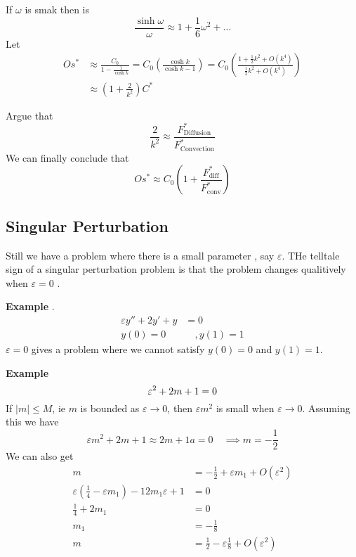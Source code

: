 \documentclass{article}
\theoremstyle{remark}
\newcommand{\newpara}
  {
  \vskip 0.4cm
  }
\begin{document}
\newpara
If $\omega $ is smak then is \[
\frac{\sinh \omega }{\omega }  \approx 1 + \frac{1}{6} \omega ^2 + \ldots
\] 
Let \[
  \begin{split}
Os ^{* }  & \approx \frac{C_{0}}{ 1- \frac{1}{\cosh k}}  = C_{0}\left( \frac{\cosh k}{ \cosh k - 1}  \right) = C_{0}\left( \frac{1+ \frac{1}{2} k^2 + O\left( k^{4} \right)}{ \frac{1}{2} k^2 + O\left( k^{4} \right)}  \right) \\
 & \approx \left( 1+ \frac{2}{k^2} \right) C^{*}
  \end{split} 
\] 

Argue that \[
\frac{2}{k ^{2}} \approx \frac{F^{*} _{\text{Diffusion}}}{ F^{*} _{\text{Convection}}} 
\] 
We can finally conclude that \[
Os ^{* } \approx C_{0}\left( 1+ \frac{F^{*} _{ \text{diff}}}{ F ^{*} _{\text{conv}}}  \right)
\] 

\subsection{Singular Perturbation}%
\label{sub:singular_perturbation}

Still we have a problem where there is a small parameter ,  say $\varepsilon $. THe telltale sign of a singular perturbation problem is that the problem changes qualitively when  $\varepsilon  = 0 $ .

\newpara
\textbf{Example} . \[
  \begin{split}
\varepsilon  y''  + 2 y'  + y &= 0 \\
y\left( 0 \right) =0  & \quad , y\left( 1 \right) = 1 
  \end{split} 
\] 
$\varepsilon  = 0$ gives a problem where we cannot satisfy $y\left( 0 \right) = 0$ and $y\left( 1 \right) = 1$.



\newpara
\textbf{Example}  \[
\varepsilon ^2 + 2m + 1 =  0 \\
\] 
 If $\left\lvert m \right\rvert  \le M$, ie $m$ is bounded as $\varepsilon  \to  0$, then $\varepsilon  m^2$ is small when $ \varepsilon  \to  0$. Assuming this we have \[
 \varepsilon m^2 + 2m + 1 \approx 2 m + 1a = 0 \quad  \implies  m = -\frac{1}{2} 
 \] 
 We can also get \[
   \begin{split}
 m  & = -\frac{1}{2} + \varepsilon m_{1} + O\left(  \varepsilon ^2\right) \\
 \varepsilon \left( \frac{1}{4} - \varepsilon m_{1} \right) - 1 2m_{1} \varepsilon  + 1 &= 0 \\
 \frac{1}{4} + 2m_{1} &= 0 \\
 m_{1}  & = -\frac{1}{8} \\
 m &= \frac{1}{2} - \varepsilon \frac{1}{8}  + O\left( \varepsilon ^2 \right) \\
   \end{split} 
 \] 
\end{document}
